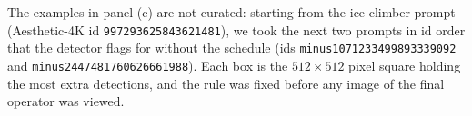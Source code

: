  The examples in panel (c) are not curated: starting from the ice-climber prompt (Aesthetic-4K id \texttt{997293625843621481}), we took the next two prompts in id order that the detector flags for \sca{} without the schedule (ids \texttt{minus1071233499893339092} and \texttt{minus2447481760626661988}). Each box is the $512\times512$ pixel square holding the most extra detections, and the rule was fixed before any image of the final operator was viewed.
